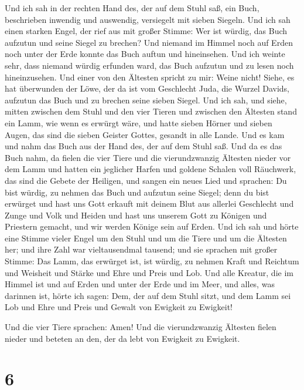 Und ich sah in der rechten Hand des, der auf dem Stuhl
saß, ein Buch, beschrieben inwendig und auswendig, versiegelt mit sieben
Siegeln.  Und ich sah einen starken Engel, der rief aus
mit großer Stimme: Wer ist würdig, das Buch aufzutun und seine Siegel zu
brechen?  Und niemand im Himmel noch auf Erden noch unter
der Erde konnte das Buch auftun und hineinsehen.  Und ich
weinte sehr, dass niemand würdig erfunden ward, das Buch aufzutun und zu
lesen noch hineinzusehen.  Und einer von den Ältesten
spricht zu mir: Weine nicht! Siehe, es hat überwunden der Löwe, der da
ist vom Geschlecht Juda, die Wurzel Davids, aufzutun das Buch und zu
brechen seine sieben Siegel.  Und ich sah, und siehe,
mitten zwischen dem Stuhl und den vier Tieren und zwischen den Ältesten
stand ein Lamm, wie wenn es erwürgt wäre, und hatte sieben Hörner und
sieben Augen, das sind die sieben Geister Gottes, gesandt in alle Lande.
 Und es kam und nahm das Buch aus der Hand des, der auf
dem Stuhl saß.  Und da es das Buch nahm, da fielen die
vier Tiere und die vierundzwanzig Ältesten nieder vor dem Lamm und
hatten ein jeglicher Harfen und goldene Schalen voll Räuchwerk, das sind
die Gebete der Heiligen,  und sangen ein neues Lied und
sprachen: Du bist würdig, zu nehmen das Buch und aufzutun seine Siegel;
denn du bist erwürget und hast uns Gott erkauft mit deinem Blut aus
allerlei Geschlecht und Zunge und Volk und Heiden  und
hast uns unserem Gott zu Königen und Priestern gemacht, und wir werden
Könige sein auf Erden.  Und ich sah und hörte eine Stimme
vieler Engel um den Stuhl und um die Tiere und um die Ältesten her; und
ihre Zahl war vieltausendmal tausend;  und sie sprachen
mit großer Stimme: Das Lamm, das erwürget ist, ist würdig, zu nehmen
Kraft und Reichtum und Weisheit und Stärke und Ehre und Preis und Lob.
 Und alle Kreatur, die im Himmel ist und auf Erden und
unter der Erde und im Meer, und alles, was darinnen ist, hörte ich
sagen: Dem, der auf dem Stuhl sitzt, und dem Lamm sei Lob und Ehre und
Preis und Gewalt von Ewigkeit zu Ewigkeit!

 Und die vier Tiere sprachen: Amen! Und die
vierundzwanzig Ältesten fielen nieder und beteten an den, der da lebt
von Ewigkeit zu Ewigkeit.

\hypertarget{section-5}{%
\section{6}\label{section-5}}

